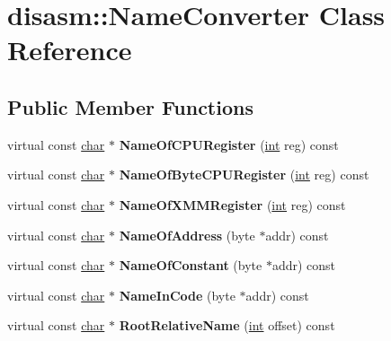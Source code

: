 \hypertarget{classdisasm_1_1NameConverter}{}\section{disasm\+:\+:Name\+Converter Class Reference}
\label{classdisasm_1_1NameConverter}
\subsection*{Public Member Functions}
\begin{DoxyCompactItemize}
\item 
\mbox{\label{classdisasm_1_1NameConverter_ad573d6114a32138ed23de34ec5e1dc0b}} 
virtual const \mbox{\hyperlink{classchar}{char}} $\ast$ {\bfseries Name\+Of\+C\+P\+U\+Register} (\mbox{\hyperlink{classint}{int}} reg) const
\item 
\mbox{\label{classdisasm_1_1NameConverter_a7ab69dbb2c7f7ff9f6f3a12a1a8b9572}} 
virtual const \mbox{\hyperlink{classchar}{char}} $\ast$ {\bfseries Name\+Of\+Byte\+C\+P\+U\+Register} (\mbox{\hyperlink{classint}{int}} reg) const
\item 
\mbox{\label{classdisasm_1_1NameConverter_a8c75e750cb9dee6d15ebf071ccee4840}} 
virtual const \mbox{\hyperlink{classchar}{char}} $\ast$ {\bfseries Name\+Of\+X\+M\+M\+Register} (\mbox{\hyperlink{classint}{int}} reg) const
\item 
\mbox{\label{classdisasm_1_1NameConverter_a98b7d1a935a593ca1951bb945d75d6f2}} 
virtual const \mbox{\hyperlink{classchar}{char}} $\ast$ {\bfseries Name\+Of\+Address} (byte $\ast$addr) const
\item 
\mbox{\label{classdisasm_1_1NameConverter_af7c771efad35304e7ad862e2c7b6074e}} 
virtual const \mbox{\hyperlink{classchar}{char}} $\ast$ {\bfseries Name\+Of\+Constant} (byte $\ast$addr) const
\item 
\mbox{\label{classdisasm_1_1NameConverter_a6359bec71df15a155496092d641a55de}} 
virtual const \mbox{\hyperlink{classchar}{char}} $\ast$ {\bfseries Name\+In\+Code} (byte $\ast$addr) const
\item 
\mbox{\label{classdisasm_1_1NameConverter_ace8bbcb5d39d1ba4ae8ef7546f3d8df6}} 
virtual const \mbox{\hyperlink{classchar}{char}} $\ast$ {\bfseries Root\+Relative\+Name} (\mbox{\hyperlink{classint}{int}} offset) const
\end{DoxyCompactItemize}
